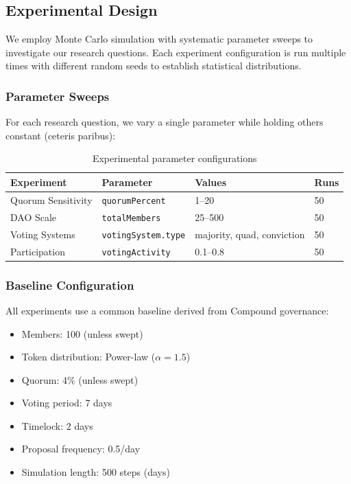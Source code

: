 
\subsection{Experimental Design}

We employ Monte Carlo simulation with systematic parameter sweeps to investigate our research questions. Each experiment configuration is run multiple times with different random seeds to establish statistical distributions.

\subsubsection{Parameter Sweeps}

For each research question, we vary a single parameter while holding others constant (ceteris paribus):

\begin{table}[htbp]
\centering
\caption{Experimental parameter configurations}
\label{tab:experiments}
\small
\begin{tabular}{@{}llll@{}}
\toprule
Experiment & Parameter & Values & Runs \\
\midrule
Quorum Sensitivity & \texttt{quorumPercent} & 1--20 & 50 \\
DAO Scale & \texttt{totalMembers} & 25--500 & 50 \\
Voting Systems & \texttt{votingSystem.type} & majority, quad, conviction & 50 \\
Participation & \texttt{votingActivity} & 0.1--0.8 & 50 \\
\bottomrule
\end{tabular}
\end{table}

\subsubsection{Baseline Configuration}

All experiments use a common baseline derived from Compound governance:

\begin{itemize}
    \item Members: 100 (unless swept)
    \item Token distribution: Power-law ($\alpha = 1.5$)
    \item Quorum: 4\% (unless swept)
    \item Voting period: 7 days
    \item Timelock: 2 days
    \item Proposal frequency: 0.5/day
    \item Simulation length: 500 steps (days)
\end{itemize}

